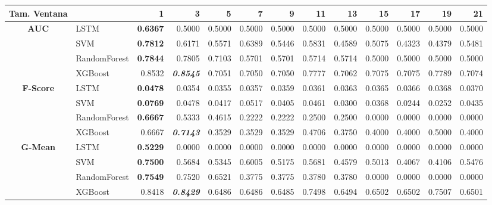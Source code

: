 \begin{table}[H]
	\centering
	\begin{adjustbox}{max width=14cm}
		\begin{tabular}{|c|l|r|r|r|r|r|r|r|r|r|r|r|}
			\hline
			\textbf{Tam. Ventana}&         &      1  &      3  &      5  &      7  &      9  &      11 &      13 &      15 &      17 &      19 &      21 \\
			\hline
			\textbf{AUC} &  LSTM & \textbf{  0.6367 } &  0.5000 &  0.5000 &  0.5000 &  0.5000 &  0.5000 &  0.5000 &  0.5000 &  0.5000 &  0.5000 &  0.5000 \\
			&  SVM & \textbf{  0.7812 } &  0.6171 &  0.5571 &  0.6389 &  0.5446 &  0.5831 &  0.4589 &  0.5075 &  0.4323 &  0.4379 &  0.5481 \\
			&  RandomForest & \textbf{  0.7844 } &  0.7805 &  0.7103 &  0.5701 &  0.5701 &  0.5714 &  0.5714 &  0.5000 &  0.5000 &  0.5000 &  0.5000 \\
			&  XGBoost &  0.8532 & \textit{ \textbf{  0.8545 } } &  0.7051 &  0.7050 &  0.7050 &  0.7777 &  0.7062 &  0.7075 &  0.7075 &  0.7789 &  0.7074 \\
			\hline
			\textbf{F-Score} &  LSTM & \textbf{  0.0478 } &  0.0354 &  0.0355 &  0.0357 &  0.0359 &  0.0361 &  0.0363 &  0.0365 &  0.0366 &  0.0368 &  0.0370 \\
			&  SVM & \textbf{  0.0769 } &  0.0478 &  0.0417 &  0.0517 &  0.0405 &  0.0461 &  0.0300 &  0.0368 &  0.0244 &  0.0252 &  0.0435 \\
			&  RandomForest & \textbf{  0.6667 } &  0.5333 &  0.4615 &  0.2222 &  0.2222 &  0.2500 &  0.2500 &  0.0000 &  0.0000 &  0.0000 &  0.0000 \\
			&  XGBoost &  0.6667 & \textit{ \textbf{  0.7143 } } &  0.3529 &  0.3529 &  0.3529 &  0.4706 &  0.3750 &  0.4000 &  0.4000 &  0.5000 &  0.4000 \\
			\hline
			\textbf{G-Mean} &  LSTM & \textbf{  0.5229 } &  0.0000 &  0.0000 &  0.0000 &  0.0000 &  0.0000 &  0.0000 &  0.0000 &  0.0000 &  0.0000 &  0.0000 \\
			&  SVM & \textbf{  0.7500 } &  0.5684 &  0.5345 &  0.6005 &  0.5175 &  0.5681 &  0.4579 &  0.5013 &  0.4067 &  0.4106 &  0.5476 \\
			&  RandomForest & \textbf{  0.7549 } &  0.7520 &  0.6521 &  0.3775 &  0.3775 &  0.3780 &  0.3780 &  0.0000 &  0.0000 &  0.0000 &  0.0000 \\
			&  XGBoost &  0.8418 & \textit{ \textbf{  0.8429 } } &  0.6486 &  0.6486 &  0.6485 &  0.7498 &  0.6494 &  0.6502 &  0.6502 &  0.7507 &  0.6501 \\

\end{tabular}
\end{adjustbox}
\end{table}
